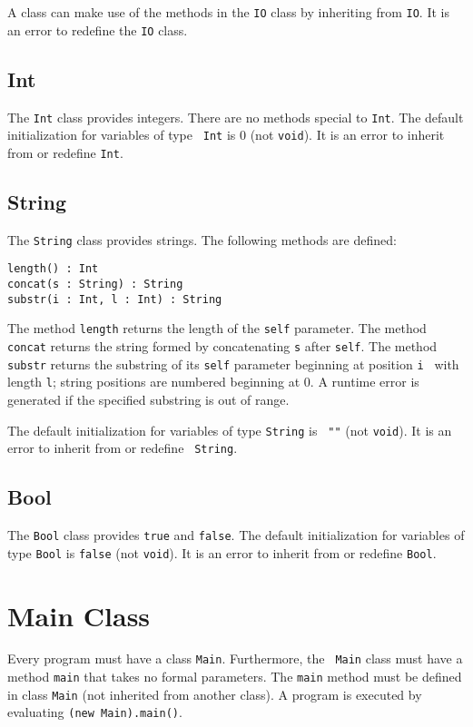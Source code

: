 \documentclass[11pt]{article}
\begin{document}
A class can make use of the methods in the {\tt IO} class by inheriting
from {\tt IO}.  It is an error to redefine the {\tt IO} class.

\subsection{Int}
\label{sec-int}

The {\tt Int} class provides integers.  There are no methods special
to {\tt Int}.  The default initialization for variables of type {\tt
Int} is 0 (not {\tt void}). It is an error to inherit from or redefine
{\tt Int}.

\subsection{String}
The {\tt String} class provides strings.  The following methods are defined:
\begin{verbatim}
length() : Int
concat(s : String) : String
substr(i : Int, l : Int) : String
\end{verbatim}
The method {\tt length} returns the length of the {\tt self} parameter.
The method {\tt concat} returns the string formed by concatenating
{\tt s} after {\tt self}.  The method {\tt substr} returns the 
substring of its {\tt self} parameter beginning at position {\tt i }
with length {\tt l}; string positions are numbered beginning at 0.
A runtime error is generated if the specified
substring is out of range.  

The default initialization for variables of type {\tt String} is {\tt
""} (not {\tt void}).  It is an error to inherit from or redefine {\tt
String}.

\subsection{Bool}
\label{sec-bool}

The {\tt Bool} class provides {\tt true} and {\tt false}.  
The default initialization for variables of type {\tt Bool} is {\tt false}
(not {\tt void}).
It is an error to inherit from or redefine {\tt Bool}.

\section{Main Class}
\label{sec-main}

Every program must have a class {\tt Main}.  Furthermore, the {\tt
Main} class must have a method {\tt main} that takes no formal
parameters.  The {\tt main} method must be defined in class {\tt Main}
(not inherited from another class).  A program is executed by
evaluating {\tt (new Main).main()}.
\end{document}
